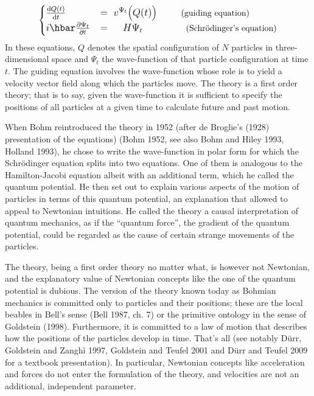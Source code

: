 \documentclass[12pt]{article}
\theoremstyle{definition}
\begin{document}
\begin{align*}
\large
\begin{cases} \frac{\mathrm{d} Q(t)}{\mathrm{d}t} &= \; v^{\Psi_t}\bigl(Q(t)\bigr) \hspace*{1cm} \text{\normalsize (guiding equation)}\\
i \hbar \frac{\partial \Psi_t}{\partial t} & = \hspace*{.5cm} H \Psi_t \hspace*{1.8cm} \text{\normalsize (Schr\"odinger's equation)}
\end{cases}
\end{align*}
In these equations, $Q$ denotes the spatial configuration of $N$ particles in three-dimensional space and $\Psi_t$ the wave-function of that particle configuration at time $t$. The guiding equation involves the wave-function whose role is to yield a velocity vector field along which the particles move. The theory is a first order theory; that is to say, given the wave-function it is sufficient to specify the positions of all particles at a given time to calculate future and past motion.

When Bohm reintroduced the theory in 1952 (after de Broglie's (1928) presentation of the equations) (Bohm 1952, see also Bohm and Hiley 1993, Holland 1993), he chose to write the wave-function in polar form for which the Schr\"odinger equation splits into two equations. One of them is analogous to the Hamilton-Jacobi equation albeit with an additional term, which he called the quantum potential. He then set out to explain various aspects of the motion of particles in terms of this quantum potential, an explanation that allowed to appeal to Newtonian intuitions. He called the theory a causal interpretation of quantum mechanics, as if the ``quantum force'', the gradient of the quantum potential, could be regarded as the cause of certain strange movements of the particles.

The theory, being a first order theory no matter what, is however not Newtonian, and the explanatory value of Newtonian concepts like the one of the quantum potential is dubious. The version of the theory known today as Bohmian mechanics is committed only to particles and their positions; these are the local beables in Bell's sense (Bell 1987, ch. 7) or the primitive ontology in the sense of Goldstein (1998). Furthermore, it is committed to a law of motion that describes how the positions of the particles develop in time. That's all (see notably D\"urr, Goldstein and Zangh\`i 1997, Goldstein and Teufel 2001 and D\"urr and Teufel 2009 for a textbook presentation). In particular, Newtonian concepts like acceleration and forces do not enter the formulation of the theory, and velocities are not an additional, independent parameter.
\end{document}
